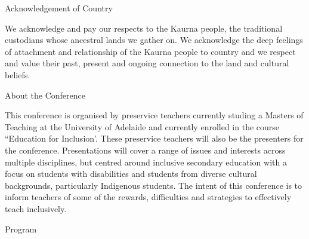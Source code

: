 \documentclass[twoside,14pt,a4paper,notitlepage]{memoir}
\newcounter{chapternonum}
\begin{document}
\pagestyle{plain}



\setcounter{tocdepth}{2}
\tableofcontents
\vfill

\clearpage{}
\vspace*{2cm}
{\Huge Acknowledgement of Country}
\vspace{2cm}

We acknowledge and pay our respects to the Kaurna people, the traditional custodians whose ancestral lands we gather on. We acknowledge the deep feelings of attachment and relationship of the Kaurna people to country and we respect and value their past, present and ongoing connection to the land and cultural beliefs.
\vfill

\clearpage{}
\vspace*{2cm}
{\Huge About the Conference}
\vspace{2cm}

This conference is organised by preservice teachers currently studing a Masters of Teaching at the University of Adelaide and currently enrolled in the course ``Education for Inclusion'. These preservice teachers will also be the presenters for the conference. Presentations will cover a range of issues and interests across multiple disciplines, but centred around inclusive secondary education with a focus on students with disabilities and students from diverse cultural backgrounds, particularly Indigenous students. The intent of this conference is to inform teachers of some of the rewards, difficulties and strategies to effectively teach inclusively. 
\vfill




%

\clearpage{}
\vspace*{2cm}
{\Huge Program}
\vspace{2cm}
\end{document}

